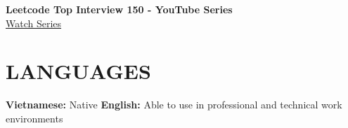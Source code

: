 \documentclass[10pt,a4paper]{article}
\begin{document}
\vspace{4pt}

\begin{minipage}[t]{0.5\textwidth}
    \textbf{\small Leetcode Top Interview 150 - YouTube Series} \hfill \textcolor{darkgray}\\[1pt]
    \href{https://www.youtube.com/playlist?list=PLE9QkkVvuT1kc_pgqSPTvgggPg37ZHA6V}{\textcolor{secondary}{\scriptsize Watch Series}}
\end{minipage}%

\vspace{6pt}

\section{LANGUAGES}
\textbf{\color{darkgray}\small Vietnamese:} \textcolor{text}{\small Native} \hspace{15pt} \textbf{\color{darkgray}\small English:} \textcolor{text}{\small  Able to use in professional and technical work environments }
\end{document}
